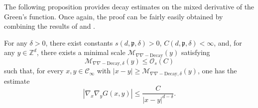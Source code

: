 \documentclass[12pt]{amsart}
\numberwithin{equation}{section}
\begin{document}
	
	The following proposition provides decay estimates on the mixed derivative of the Green's function. Once again, the proof can be fairly easily obtained by combining the results of \cite{dario-gu-green}
	and \cite{armstrong-dario-2018}.
	
	
	\begin{prop} \label{prop:green-mixed-derivative}
		For any $\delta > 0$, there exist constants $s(d , \mathfrak{p}, \delta)> 0$, $C (d , \mathfrak{p}, \delta) < \infty$, and, for any $y \in \mathbb{Z}^d$, there exists a minimal scale $\mathcal{M}_{\nabla\nabla-\mathrm{Decay}}(y)$
		satisfying 
		\begin{equation} \label{eq:stoch.estMdecay}
			\mathcal{M}_{\nabla\nabla-\mathrm{Decay}, \delta}(y) \leq \mathcal{O}_s(C)
		\end{equation}
		such that, for every $x, y \in \mathscr{C}_\infty$ with $|x - y| \geq \mathcal{M}_{\nabla\nabla-\mathrm{Decay}, \delta}(y)$, one has the estimate
		\begin{equation*}
			|\nabla_x \nabla_y G(x, y)| \leq \frac{C}{|x - y|^{d - \delta}}.
		\end{equation*}
	\end{prop}
	
\end{document}
